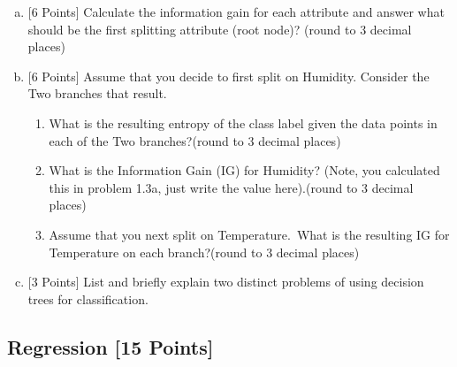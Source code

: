\documentclass{homework}
\begin{document}
\begin{enumerate}[(a)]
    \item {[6 Points]} Calculate the information gain for each attribute and answer what should be the first splitting attribute (root node)? (round to 3 decimal places)

    \vspace{200px}
    
    \item {[6 Points]} Assume that you decide to first split on Humidity. Consider the Two branches that result.
  \begin{enumerate}[label=(\roman*)]

    \item What is the resulting entropy of the class label given the data points in each of the Two branches?(round to 3 decimal places)

    \vspace{200px}
    \item What is the Information Gain (IG) for Humidity? (Note, you calculated this in problem 1.3a, just write the value here).(round to 3 decimal places)
\vspace{100px}
    \item Assume that you next split on Temperature. What is the resulting IG for Temperature on each branch?(round to 3 decimal places)



\end{enumerate}
    \vspace{200px}
    \item {[3 Points]} List and briefly explain two distinct problems of using decision trees for classification.

    \vspace{200px}
    
    
\end{enumerate}


\newpage
\subsection{Regression [15 Points]}
\end{document}
